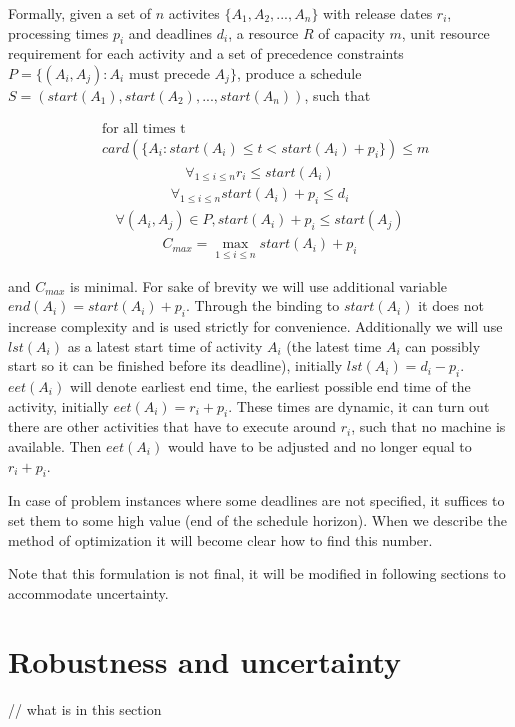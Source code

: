 \documentclass{article}
\theoremstyle{definition}
\begin{document}
Formally, given a set of $n$ activites $\{A_1, A_2, ..., A_n\}$ with release dates $r_i$, processing times $p_i$ and deadlines $d_i$, a resource $R$ of capacity $m$, unit resource requirement for each activity and a set of precedence constraints $P = \{(A_i, A_j) : A_i \text{ must precede } A_j\}$, produce a schedule $S = (start(A_1), start(A_2), ..., start(A_n))$, such that

\begin{align}
&\text{for all times t} \nonumber\\
&card(\{A_i : start(A_i) \leq t < start(A_i) + p_i\}) \leq m
\end{align}
\begin{align}
\forall_{1 \leq i \leq n} r_i \leq start(A_i)
\end{align}
\begin{align}
\forall_{1 \leq i \leq n} start(A_i) + p_i \leq d_i
\end{align}
\begin{align}
\forall (A_i, A_j) \in P, start(A_i) + p_i \leq start(A_j)
\end{align}
\begin{align}
C_{max} = \max_{1 \leq i \leq n} start(A_i) + p_i
\end{align}

and $C_{max}$ is minimal. For sake of brevity we will use additional variable $end(A_i) = start(A_i) + p_i$. Through the binding to $start(A_i)$ it does not increase complexity and is used strictly for convenience. Additionally we will use $lst(A_i)$ as a latest start time of activity $A_i$ (the latest time $A_i$ can possibly start so it can be finished before its deadline), initially $lst(A_i) = d_i - p_i$. $eet(A_i)$ will denote earliest end time, the earliest possible end time of the activity, initially $eet(A_i) = r_i + p_i$. These times are dynamic, it can turn out there are other activities that have to execute around $r_i$, such that no machine is available. Then $eet(A_i)$ would have to be adjusted and no longer equal to $r_i + p_i$.

In case of problem instances where some deadlines are not specified, it suffices to set them to some high value (end of the schedule horizon). When we describe the method of optimization it will become clear how to find this number.

Note that this formulation is not final, it will be modified in following sections to accommodate uncertainty.

\section{Robustness and uncertainty}
// what is in this section
\end{document}
